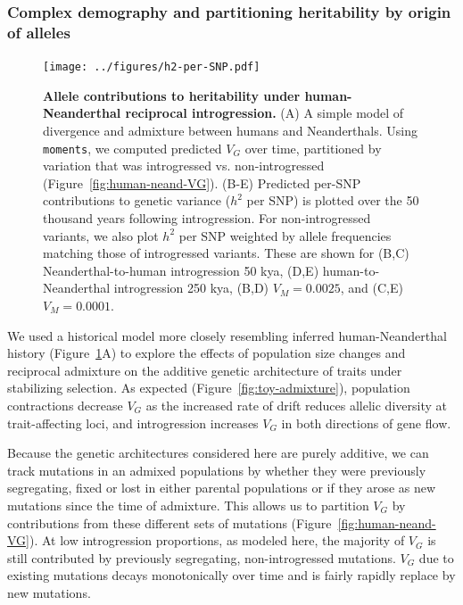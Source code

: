 \documentclass{article}
\newcommand{\moments}{\texttt{moments}\xspace}
\begin{document}
\subsubsection*{Complex demography and partitioning heritability by origin of alleles}

\begin{figure}[t!]
    \centering
    \texttt{[image: ../figures/h2-per-SNP.pdf]}
    \caption{
        \textbf{Allele contributions to heritability under human-Neanderthal
        reciprocal introgression.}
        (A) A simple model of divergence and admixture between humans and
        Neanderthals. Using \moments, we computed predicted $V_G$ over time,
        partitioned by variation that was introgressed vs. non-introgressed
        (Figure~\ref{fig:human-neand-VG}).
        (B-E) Predicted per-SNP contributions to genetic variance ($h^2$ per
        SNP) is plotted over the 50 thousand years following introgression.
        For non-introgressed variants, we also plot $h^2$ per SNP weighted by
        allele frequencies matching those of introgressed variants. These
        are shown for (B,C) Neanderthal-to-human introgression 50 kya,
        (D,E) human-to-Neanderthal introgression 250 kya, (B,D) $V_M=0.0025$,
        and (C,E) $V_M=0.0001$.
    }
    \label{fig:human-neand-h2}
\end{figure}


We used a historical model more closely resembling inferred human-Neanderthal
history (Figure~\ref{fig:human-neand-h2}A) to explore the effects of population
size changes and reciprocal admixture on the additive genetic architecture of
traits under stabilizing selection. As expected
(Figure~\ref{fig:toy-admixture}), population contractions decrease $V_G$ as the
increased rate of drift reduces allelic diversity at trait-affecting loci, and
introgression increases $V_G$ in both directions of gene flow.

Because the genetic architectures considered here are purely additive, we can
track mutations in an admixed populations by whether they were previously
segregating, fixed or lost in either parental populations or if they arose as
new mutations since the time of admixture. This allows us to partition $V_G$ by
contributions from these different sets of mutations
(Figure~\ref{fig:human-neand-VG}). At low introgression proportions, as modeled
here, the majority of $V_G$ is still contributed by previously segregating,
non-introgressed mutations. $V_G$ due to existing mutations decays
monotonically over time and is fairly rapidly replace by new mutations.
\end{document}
